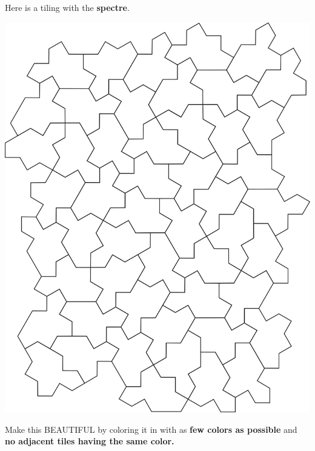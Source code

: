 \documentclass[noauthor,nooutcomes,handout,hints,12pt]{ximera}
\begin{document}
\begin{question}
  Here is a tiling with the \textbf{spectre}.
  \begin{center}
    \includegraphics[scale=.9]{spectre.png}
  \end{center}
  Make this BEAUTIFUL by coloring it in with as \textbf{few colors as
    possible} and \textbf{no adjacent tiles having the same color.}
\end{question}

\mynewpage
\end{document}
